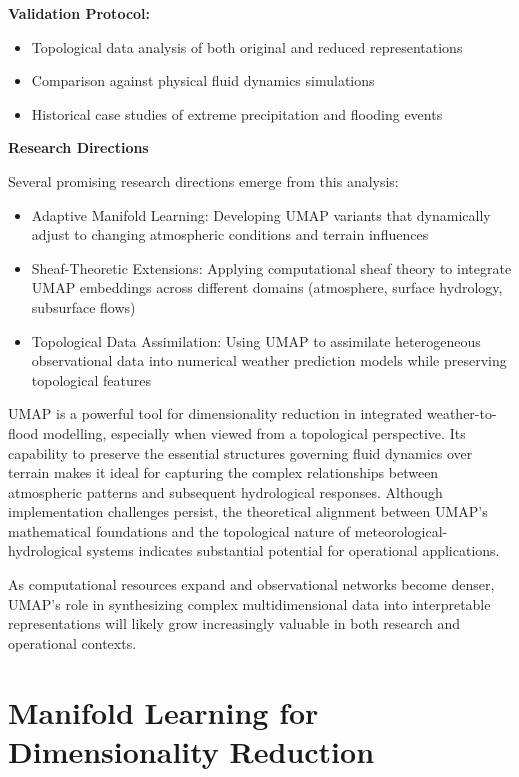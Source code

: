 \documentclass{article}
\begin{document}
\textbf{Validation Protocol:}

\begin{itemize}
	\item		Topological data analysis of both original and reduced representations
	\item		Comparison against physical fluid dynamics simulations
	\item		Historical case studies of extreme precipitation and flooding events
\end{itemize}


\textbf{Research Directions}

Several promising research directions emerge from this analysis:
\begin{itemize}
	\item		Adaptive Manifold Learning: Developing UMAP variants that dynamically adjust to changing atmospheric conditions and terrain influences
	\item		Sheaf-Theoretic Extensions: Applying computational sheaf theory to integrate UMAP embeddings across different domains (atmosphere, surface hydrology, subsurface flows)
	\item		Topological Data Assimilation: Using UMAP to assimilate heterogeneous observational data into numerical weather prediction models while preserving topological features
\end{itemize}


UMAP is a powerful tool for dimensionality reduction in integrated weather-to-flood modelling, especially when viewed from a topological perspective. Its capability to preserve the essential structures governing fluid dynamics over terrain makes it ideal for capturing the complex relationships between atmospheric patterns and subsequent hydrological responses. Although implementation challenges persist, the theoretical alignment between UMAP's mathematical foundations and the topological nature of meteorological-hydrological systems indicates substantial potential for operational applications.\par

As computational resources expand and observational networks become denser, UMAP's role in synthesizing complex multidimensional data into interpretable representations will likely grow increasingly valuable in both research and operational contexts.\par



\section{Manifold Learning for Dimensionality Reduction}
\end{document}
